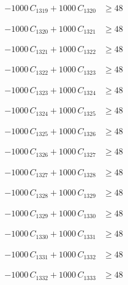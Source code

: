 \documentclass[a4paper,11pt]{article}
\begin{document}
\begin{align}
-1000\,C_{1319} + 1000\,C_{1320} &\geq 48 \nonumber
\end{align}

\begin{align}
-1000\,C_{1320} + 1000\,C_{1321} &\geq 48 \nonumber
\end{align}

\begin{align}
-1000\,C_{1321} + 1000\,C_{1322} &\geq 48 \nonumber
\end{align}

\begin{align}
-1000\,C_{1322} + 1000\,C_{1323} &\geq 48 \nonumber
\end{align}

\begin{align}
-1000\,C_{1323} + 1000\,C_{1324} &\geq 48 \nonumber
\end{align}

\begin{align}
-1000\,C_{1324} + 1000\,C_{1325} &\geq 48 \nonumber
\end{align}

\begin{align}
-1000\,C_{1325} + 1000\,C_{1326} &\geq 48 \nonumber
\end{align}

\begin{align}
-1000\,C_{1326} + 1000\,C_{1327} &\geq 48 \nonumber
\end{align}

\begin{align}
-1000\,C_{1327} + 1000\,C_{1328} &\geq 48 \nonumber
\end{align}

\begin{align}
-1000\,C_{1328} + 1000\,C_{1329} &\geq 48 \nonumber
\end{align}

\begin{align}
-1000\,C_{1329} + 1000\,C_{1330} &\geq 48 \nonumber
\end{align}

\begin{align}
-1000\,C_{1330} + 1000\,C_{1331} &\geq 48 \nonumber
\end{align}

\begin{align}
-1000\,C_{1331} + 1000\,C_{1332} &\geq 48 \nonumber
\end{align}

\begin{align}
-1000\,C_{1332} + 1000\,C_{1333} &\geq 48 \nonumber
\end{align}
\end{document}
